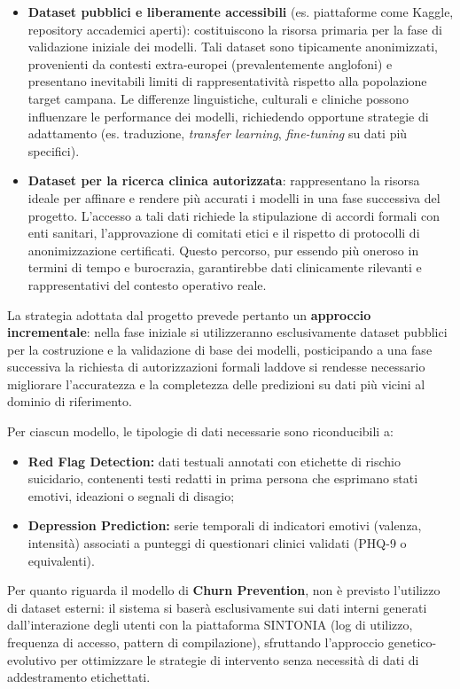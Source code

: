 \begin{itemize}
    \item \textbf{Dataset pubblici e liberamente accessibili} (es. piattaforme come Kaggle, repository accademici aperti): costituiscono la risorsa primaria per la fase di validazione iniziale dei modelli. Tali dataset sono tipicamente anonimizzati, provenienti da contesti extra-europei (prevalentemente anglofoni) e presentano inevitabili limiti di rappresentatività rispetto alla popolazione target campana. Le differenze linguistiche, culturali e cliniche possono influenzare le performance dei modelli, richiedendo opportune strategie di adattamento (es. traduzione, \textit{transfer learning}, \textit{fine-tuning} su dati più specifici).

    \item \textbf{Dataset per la ricerca clinica autorizzata}: rappresentano la risorsa ideale per affinare e rendere più accurati i modelli in una fase successiva del progetto. L'accesso a tali dati richiede la stipulazione di accordi formali con enti sanitari, l'approvazione di comitati etici e il rispetto di protocolli di anonimizzazione certificati. Questo percorso, pur essendo più oneroso in termini di tempo e burocrazia, garantirebbe dati clinicamente rilevanti e rappresentativi del contesto operativo reale.
\end{itemize}

La strategia adottata dal progetto prevede pertanto un \textbf{approccio incrementale}: nella fase iniziale si utilizzeranno esclusivamente dataset pubblici per la costruzione e la validazione di base dei modelli, posticipando a una fase successiva la richiesta di autorizzazioni formali laddove si rendesse necessario migliorare l'accuratezza e la completezza delle predizioni su dati più vicini al dominio di riferimento.

Per ciascun modello, le tipologie di dati necessarie sono riconducibili a:
\begin{itemize}
    \item \textbf{Red Flag Detection:} dati testuali annotati con etichette di rischio suicidario, contenenti testi redatti in prima persona che esprimano stati emotivi, ideazioni o segnali di disagio;
    \item \textbf{Depression Prediction:} serie temporali di indicatori emotivi (valenza, intensità) associati a punteggi di questionari clinici validati (PHQ-9 o equivalenti).
\end{itemize}

Per quanto riguarda il modello di \textbf{Churn Prevention}, non è previsto l'utilizzo di dataset esterni: il sistema si baserà esclusivamente sui dati interni generati dall'interazione degli utenti con la piattaforma SINTONIA (log di utilizzo, frequenza di accesso, pattern di compilazione), sfruttando l'approccio genetico-evolutivo per ottimizzare le strategie di intervento senza necessità di dati di addestramento etichettati.



